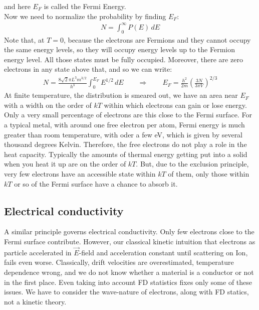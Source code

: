 \documentclass[11pt]{article}
\theoremstyle{break}
\theoremstyle{break}
\begin{document}
and here $E_F$ is called the Fermi Energy.\\ Now we need to normalize the probability by finding $E_F$:
\begin{align*}
N = \int_0^\infty P(E)\, dE
\end{align*}
Note that, at $T=0$, because the electrons are Fermions and they cannot occupy the same energy levels, so they will occupy energy levels up to the Fermion energy level. All those states must be fully occupied. Moreover, there are zero electrons in any state above that, and so we can write:
\begin{align*}
N = \frac{8\sqrt{2}\pi L^3 m^{3/2}}{h^3}\int_0^{E_F}E^{1/2}\, dE \qquad \Rightarrow \qquad E_F = \frac{h^2}{2m}\left( \frac{3N}{3\pi V}\right)^{2/3}
\end{align*}
At finite temperature, the distribution is smeared out, we have an area near $E_F$ with a width on the order of $kT$ within which electrons can gain or lose energy. Only a very small percentage of electrons are this close to the Fermi surface. For a typical metal, with around one free electron per atom, Fermi energy is much greater than room temperature, with oder a few eV, which is given by several thousand degrees Kelvin. Therefore, the free electrons do not play a role in the heat capacity. 
Typically the amounts of thermal energy getting put into a solid when you heat it up are on the order of $kT$. But, due to the exclusion principle, very few electrons have an accessible state within $kT$ of them, only those within $kT$ or so of the Fermi surface have a chance to absorb it. \\

\subsection{Electrical conductivity}
A similar principle governs electrical conductivity. Only few electrons close to the Fermi surface contribute. However, our classical kinetic intuition that electrons as particle accelerated in $\vec{E}$-field and  acceleration constant until scattering on Ion, fails even worse. Classically,
drift velocities are overestimated,
temperature dependence wrong,
and we do not know whether a material is a conductor or not in the first place. Even taking into account FD statistics fixes only some of these issues. We have to consider the wave-nature of electrons, along with FD statics, not a kinetic theory. \\
\end{document}
